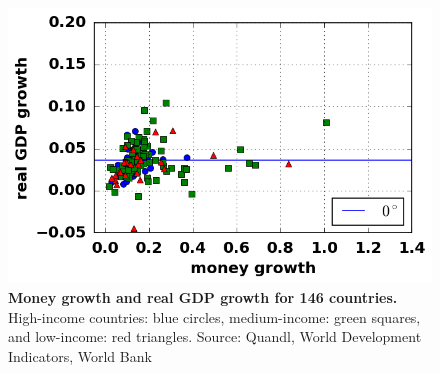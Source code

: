 \begin{figure}[h]
\caption{\label{fig_inflationGDPOpen} \textbf{Money growth and real GDP growth for 146 countries.} High-income countries: blue circles, medium-income: green squares, and low-income: red triangles. {\tiny Source: Quandl, World Development Indicators, World Bank}}
\hspace*{-.5cm}\includegraphics[height = 7.cm]{fig_moneyGDPOpen.png}
\end{figure}
